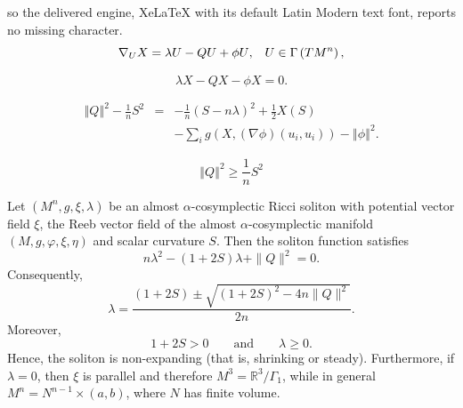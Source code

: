 \documentclass[10pt,a4paper]{amsart}
\begin{document}
so the delivered engine, XeLaTeX with its default Latin Modern text font, reports no missing character.
\begin{equation}\label{e1}
{\nabla} _{U}X=\lambda U-QU+\phi U\text{,\quad }U\in \Gamma \left(
TM^{n}\right) \text{,}  
\end{equation}

\begin{equation}\label{e2}
\lambda X-QX -\phi X=0\text{.}  
\end{equation}

\begin{eqnarray}\label{e5}
\left\Vert Q\right\Vert ^{2}-\frac{1}{n}S^{2} &=&-\frac{1}{n}\left(
S-n\lambda \right) ^{2}+\frac{1}{2}X(S)   \\
&&-\sum\limits_{i}g\left( X,\left( \nabla \phi \right) \left(
u_{i},u_{i}\right) \right) -\left\Vert \phi \right\Vert ^{2}\text{.} 
\nonumber
\end{eqnarray}

\begin{equation}\label{e9}
\left\Vert Q\right\Vert ^{2}\geq \frac{1}{n}S^{2}  
\end{equation}

\begin{lemma}\label{alpha-cosym}
Let $(M^n,g,\xi,\lambda)$ be an almost $\alpha$-cosymplectic
Ricci soliton with potential vector field $\xi$, the Reeb vector
field of the almost $\alpha$-cosymplectic manifold
$(M,g,\varphi,\xi,\eta)$ and scalar curvature $S$.
Then the soliton function satisfies
\[
n\lambda^2-(1+2S)\lambda+\|Q\|^2=0.
\]
Consequently,
\begin{equation}\label{lambdaeq}
\lambda=
\frac{(1+2S)\pm\sqrt{(1+2S)^2-4n\|Q\|^2}}{2n}.
\end{equation}
Moreover,
\[
1+2S>0
\qquad\text{and}\qquad
\lambda\ge0.
\]
Hence, the soliton is non-expanding (that is, shrinking or steady).
Furthermore, if $\lambda=0$, then $\xi$ is parallel and therefore
$M^3=\mathbb R^3/\Gamma_1$, while in general
$M^n=N^{n-1}\times(a,b)$, where $N$ has finite volume.
\end{lemma}
\end{document}
